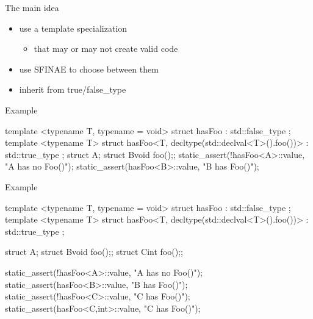 \begin{frame}[fragile]
  \begin{block}{The main idea}
    \begin{itemize}
    \item use a template specialization
      \begin{itemize}
      \item that may or may not create valid code
      \end{itemize}
    \item use SFINAE to choose between them
    \item inherit from true/false\_type
    \end{itemize}
  \end{block}
  \begin{exampleblock}{Example}
    \small
    \begin{cppcode*}{}
      template <typename T, typename = void>
      struct hasFoo : std::false_type {};
      template <typename T>
      struct hasFoo<T, decltype(std::declval<T>().foo())>
        : std::true_type {};
      struct A{}; struct B{void foo();};
      static_assert(!hasFoo<A>::value, "A has no Foo()");
      static_assert(hasFoo<B>::value, "B has Foo()");
    \end{cppcode*}
  \end{exampleblock}  
\end{frame}

\begin{frame}[fragile]
  \begin{exampleblock}{Example}
    \small
    \begin{cppcode*}{}
      template <typename T, typename = void>
      struct hasFoo : std::false_type {};
      template <typename T>
      struct hasFoo<T, decltype(std::declval<T>().foo())>
        : std::true_type {};
      
      struct A{};
      struct B{void foo();};
      struct C{int foo();};
      
      static_assert(!hasFoo<A>::value, "A has no Foo()");
      static_assert(hasFoo<B>::value, "B has Foo()");
      static_assert(!hasFoo<C>::value, "C has Foo()");
      static_assert(hasFoo<C,int>::value, "C has Foo()");
    \end{cppcode*}
  \end{exampleblock}
\end{frame}

